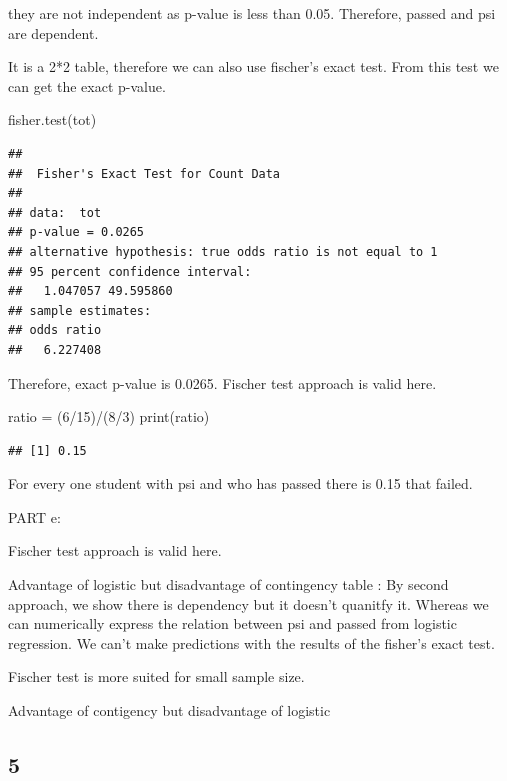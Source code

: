 \documentclass[
]{article}
\newenvironment{Shaded}{\begin{snugshade}}{\end{snugshade}}
\newcommand{\DecValTok}[1]{\textcolor[rgb]{0.00,0.00,0.81}{#1}}
\newcommand{\FunctionTok}[1]{\textcolor[rgb]{0.00,0.00,0.00}{#1}}
\newcommand{\NormalTok}[1]{#1}
\newcommand{\OtherTok}[1]{\textcolor[rgb]{0.56,0.35,0.01}{#1}}
\newcommand{\SpecialCharTok}[1]{\textcolor[rgb]{0.00,0.00,0.00}{#1}}
\begin{document}
they are not independent as p-value is less than 0.05. Therefore, passed
and psi are dependent.

It is a 2*2 table, therefore we can also use fischer's exact test. From
this test we can get the exact p-value.

\begin{Shaded}
\begin{Highlighting}[]
\FunctionTok{fisher.test}\NormalTok{(tot)}
\end{Highlighting}
\end{Shaded}

\begin{verbatim}
## 
##  Fisher's Exact Test for Count Data
## 
## data:  tot
## p-value = 0.0265
## alternative hypothesis: true odds ratio is not equal to 1
## 95 percent confidence interval:
##   1.047057 49.595860
## sample estimates:
## odds ratio 
##   6.227408
\end{verbatim}

Therefore, exact p-value is 0.0265. Fischer test approach is valid here.

\begin{Shaded}
\begin{Highlighting}[]
\NormalTok{ratio }\OtherTok{=}\NormalTok{ (}\DecValTok{6}\SpecialCharTok{/}\DecValTok{15}\NormalTok{)}\SpecialCharTok{/}\NormalTok{(}\DecValTok{8}\SpecialCharTok{/}\DecValTok{3}\NormalTok{)}
\FunctionTok{print}\NormalTok{(ratio)}
\end{Highlighting}
\end{Shaded}

\begin{verbatim}
## [1] 0.15
\end{verbatim}

For every one student with psi and who has passed there is 0.15 that
failed.

PART e:

Fischer test approach is valid here.

Advantage of logistic but disadvantage of contingency table : By second
approach, we show there is dependency but it doesn't quanitfy it.
Whereas we can numerically express the relation between psi and passed
from logistic regression. We can't make predictions with the results of
the fisher's exact test.

Fischer test is more suited for small sample size.

Advantage of contigency but disadvantage of logistic

\hypertarget{section-4}{%
\subsection{5}\label{section-4}}
\end{document}
